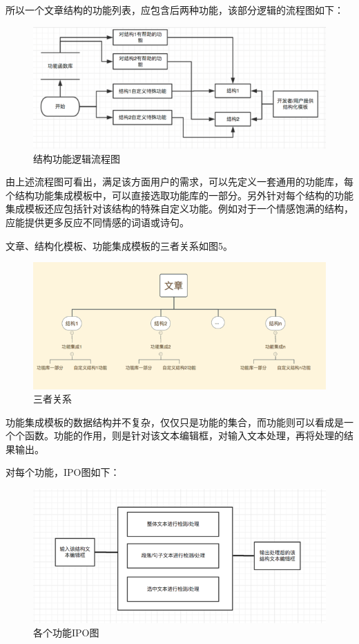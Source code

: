 \documentclass[10pt,letterpaper]{article}
\begin{document}
所以一个文章结构的功能列表，应包含后两种功能，该部分逻辑的流程图如下：

\begin{figure}[H]
	\begin{center}
		\includegraphics[width=0.5\linewidth]{__4.png}
		\caption{结构功能逻辑流程图}
		\label{Fig:1}
	\end{center}
	\vspace{-0.5em}
\end{figure}

由上述流程图可看出，满足该方面用户的需求，可以先定义一套通用的功能库，每个结构功能集成模板中，可以直接选取功能库的一部分。另外针对每个结构的功能集成模板还应包括针对该结构的特殊自定义功能。例如对于一个情感饱满的结构，应能提供更多反应不同情感的词语或诗句。

文章、结构化模板、功能集成模板的三者关系如图5。

\begin{figure}[H]
	\begin{center}
		\includegraphics[width=0.5\linewidth]{___5.png}
		\caption{三者关系}
		\label{Fig:1}
	\end{center}
	\vspace{-0.5em}
\end{figure}

功能集成模板的数据结构并不复杂，仅仅只是功能的集合，而功能则可以看成是一个个函数。功能的作用，则是针对该文本编辑框，对输入文本处理，再将处理的结果输出。

对每个功能，IPO图如下：

\begin{figure}[H]
	\begin{center}
		\includegraphics[width=0.5\linewidth]{___6.png}
		\caption{各个功能IPO图}
		\label{Fig:1}
	\end{center}
	\vspace{-0.5em}
\end{figure}
\end{document}
